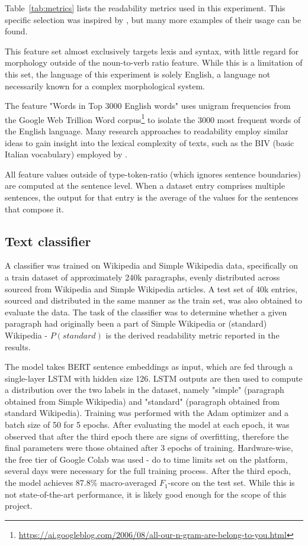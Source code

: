 \documentclass[11pt]{article}
\begin{document}


Table~\ref{tab:metrics} lists the readability metrics used in this experiment. This specific selection was inspired by \citep{venturi-etal-2015-nlp}, but many more examples of their usage can be found. 

This feature set almost exclusively targets lexis and syntax, with little regard for morphology outside of the noun-to-verb ratio feature. While this is a limitation of this set, the language of this experiment is solely English, a language not necessarily known for a complex morphological system.

The feature "Words in Top 3000 English words" uses unigram frequencies from the Google Web Trillion Word corpus\footnote{\url{https://ai.googleblog.com/2006/08/all-our-n-gram-are-belong-to-you.html}} to isolate the 3000 most frequent words of the English language. Many research approaches to readability employ similar ideas to gain insight into the lexical complexity of texts, such as the BIV (basic Italian vocabulary) employed by \citep{dellorletta-etal-2011-read}.

All feature values outside of type-token-ratio (which ignores sentence boundaries) are computed at the sentence level. When a dataset entry comprises multiple sentences, the output for that entry is the average of the values for the sentences that compose it. 

\subsection{Text classifier}

A classifier was trained on Wikipedia and Simple Wikipedia data, specifically on a train dataset of approximately 240k paragraphs, evenly distributed across sourced from Wikipedia and Simple Wikipedia articles. A test set of 40k entries, sourced and distributed in the same manner as the train set, was also obtained to evaluate the data. The task of the classifier was to determine whether a given paragraph had originally been a part of Simple Wikipedia or (standard) Wikipedia - $P(standard)$ is the derived readability metric reported in the results.

The model takes BERT sentence embeddings as input, which are fed through a single-layer LSTM with hidden size 126. LSTM outputs are then used to compute a distribution over the two labels in the dataset, namely "simple" (paragraph obtained from Simple Wikipedia) and "standard" (paragraph obtained from standard Wikipedia). Training was performed with the Adam optimizer and a batch size of 50 for 5 epochs. After evaluating the model at each epoch, it was observed that after the third epoch there are signs of overfitting, therefore the final parameters were those obtained after 3 epochs of training. Hardware-wise, the free tier of Google Colab was used - do to time limits set on the platform, several days were necessary for the full training process. 
After the third epoch, the model achieves 87.8\% macro-averaged $F_1$-score on the test set. While this is not state-of-the-art performance, it is likely good enough for the scope of this project.
\end{document}

